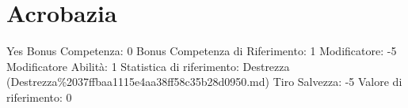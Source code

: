 \section{Acrobazia}\label{acrobazia}

\begin{description}
\tightlist
\item[Tags: ABI]
Yes Bonus Competenza: 0 Bonus Competenza di Riferimento: 1 Modificatore:
-5 Modificatore Abilità: 1 Statistica di riferimento: Destrezza
(Destrezza\%2037ffbaa1115e4aa38ff58c35b28d0950.md) Tiro Salvezza: -5
Valore di riferimento: 0
\end{description}
